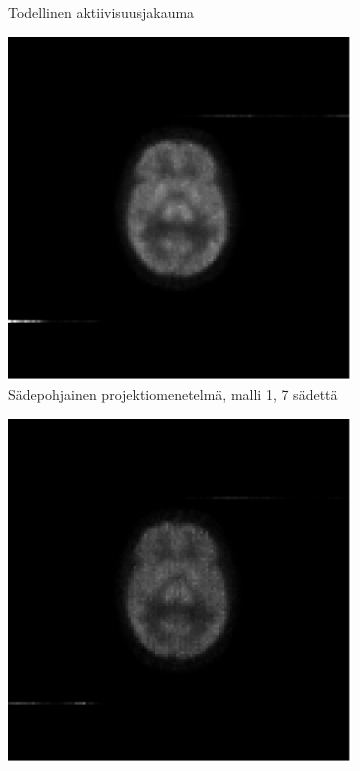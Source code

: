 \begin{figure}[H]
\begin{subfigure}[t]{.25\textwidth}
        \caption{Todellinen aktiivisuusjakauma}
    \end{subfigure}%
    \hspace{.075\textwidth}%
    \begin{subfigure}[t]{.25\textwidth}
        \includegraphics[width=\linewidth]{kuvat/cbf_rekonstruktio_proj1_malli1_nRay7.pdf}
        \caption{Sädepohjainen projektiomenetelmä, malli 1, 7 sädettä}
    \end{subfigure}
    \begin{subfigure}[b]{.25\textwidth}
        \includegraphics[width=\linewidth]{kuvat/cbf_rekonstruktio_proj1_malli2_nRay7.pdf}

\end{subfigure}
\end{figure}
